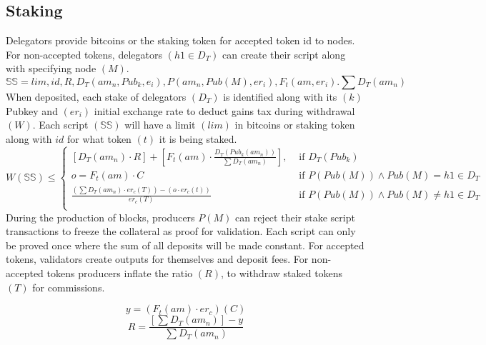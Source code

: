 \documentclass[../Bitcoin Blink.tex]{subfiles}
\begin{document}
\normalsize
\subsection{Staking}
Delegators provide bitcoins or the staking token for accepted token id to nodes. For non-accepted tokens, delegators $(h1 \in D_T)$ can create their script along with specifying node $(M)$.
\begin{equation*}
\mathbb{SS} = lim,id,R,D_T(am_n,Pub_k,e_i), P(am_n,Pub(M),er_i),F_t(am,er_i). \sum D_T(am_n)
\end{equation*}
When deposited, each stake of delegators $(D_T)$ is identified along with its $(k)$ Pubkey and $(er_i)$ initial exchange rate to deduct gains tax during withdrawal $(W)$. Each script $(\mathbb{SS})$ will have a limit $(lim)$ in bitcoins or staking token along with $id$ for what token $(t)$ it is being staked.
\begin{equation*}
W(\mathbb{SS}) \leq
\begin{cases} 
[D_T(am_n) \cdot R] + [F_t(am) \cdot \frac{D_T(Pub_k(am_n))}{\sum D_T(am_n)}]  , & \text{ if } D_T(Pub_k) \\
o=F_t(am) \cdot C & \text{ if } P(Pub(M)) \wedge Pub(M)= h1 \in D_T\\
\frac{(\sum D_T(am_n) \cdot er_c(T))-(o \cdot er_c(t))}{er_c(T)}  & \text{ if } P(Pub(M)) \wedge Pub(M)\neq h1 \in D_T\\
\end{cases}
\end{equation*}
During the production of blocks, producers $P(M)$ can reject their stake script transactions to freeze the collateral as proof for validation. Each script can only be proved once where the sum of all deposits will be made constant. For accepted tokens, validators create outputs for themselves and deposit fees. For non-accepted tokens producers inflate the ratio $(R)$, to withdraw staked tokens $(T)$ for commissions.

\begin{equation*}
y=(F_t(am) \cdot er_c)(C)
\end{equation*}
\begin{equation*}
R=\frac{[\sum D_T(am_n)]-y}{\sum D_T(am_n)}
\end{equation*}
\end{document}
